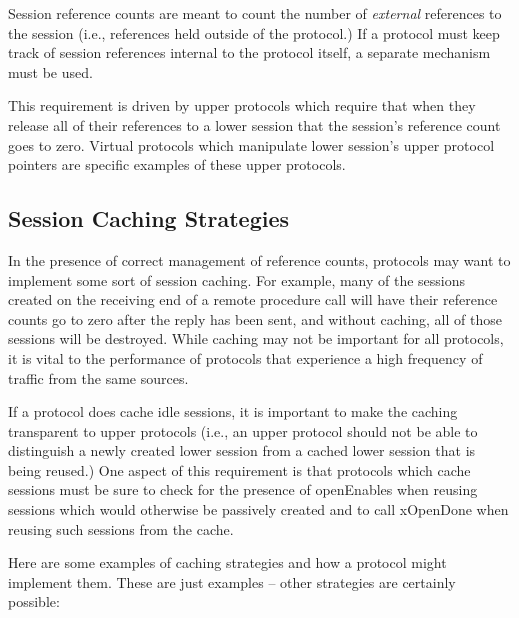 Session reference counts are meant to count the number of {\em
external} references to the session (i.e., references held outside of
the protocol.)  If a protocol must keep track of session references
internal to the protocol itself, a separate mechanism must be used.

This requirement is driven by upper protocols which require that when
they release all of their references to a lower session that the
session's reference count goes to zero.  Virtual protocols which
manipulate lower session's upper protocol pointers are specific
examples of these upper protocols.


\subsection{Session Caching Strategies}

In the presence of correct management of reference counts, protocols
may want to implement some sort of session caching.  For example, many
of the sessions created on the receiving end of a remote procedure
call will have their reference counts go to zero after the reply has
been sent, and without caching, all of those sessions will be
destroyed.  While caching may not be important for all protocols, it
is vital to the performance of protocols that experience a high
frequency of traffic from the same sources.

If a protocol does cache idle sessions, it is important to make the
caching transparent to upper protocols (i.e., an upper protocol should
not be able to distinguish a newly created lower session from a
cached lower session that is being reused.)  One aspect of this
requirement is that protocols which cache sessions must be sure to
check for the presence of openEnables when reusing sessions which
would otherwise be passively created and to 
call xOpenDone when reusing such sessions from the cache.

Here are some examples of caching strategies and how a protocol might
implement them.  These are just examples -- other strategies are
certainly possible:

